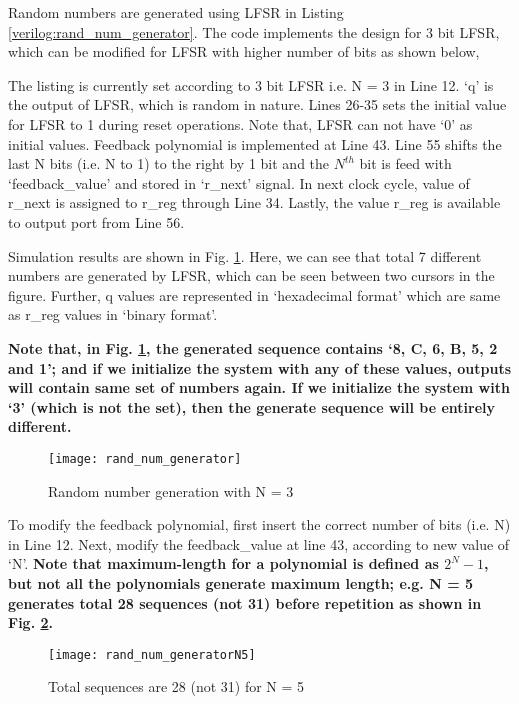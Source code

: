Random numbers are generated using LFSR in Listing \ref{verilog:rand_num_generator}. The code implements the design for 3 bit LFSR, which can be modified for LFSR with higher number of bits as shown below,  
\begin{explanation}
	The listing is currently set according to 3 bit LFSR i.e. N = 3 in Line 12.  `q' is the output of LFSR, which is random in nature. Lines 26-35 sets the initial value for LFSR to 1 during reset operations. Note that, LFSR can not have `0' as initial values. Feedback polynomial is implemented at Line 43. Line 55 shifts the last N bits (i.e. N to 1) to the right by 1 bit and the $N^{th}$ bit is feed with `feedback\_value' and stored in `r\_next' signal. In next clock cycle, value of r\_next is assigned to r\_reg through Line 34. Lastly, the value r\_reg is available to output port from Line 56.
	
	Simulation results are shown in Fig. \ref{fig:rand_num_generator}. Here, we can see that total 7 different numbers are generated by LFSR, which can be seen between two cursors in the figure.  Further, q values are represented in `hexadecimal format' which are same as r\_reg values in `binary format'. 
	
	\textbf{Note that, in Fig. \ref{fig:rand_num_generator}, the generated sequence contains `8, C, 6, B, 5, 2 and 1'; and if we initialize the system with any of these values, outputs will contain same set of numbers again. If we initialize the system with `3' (which is not the set), then the generate sequence will be entirely different.}
	
	\begin{figure}[!h]
		\centering
		\texttt{[image: rand\_num\_generator]}
		\caption{Random number generation with N = 3}
		\label{fig:rand_num_generator}
	\end{figure}
	
	To modify the feedback polynomial, first insert the correct number of bits (i.e. N) in  Line 12. Next, modify the feedback\_value at line 43, according to new value of `N'.\textbf{ Note that maximum-length for a polynomial is defined as $2^N-1$, but not all the polynomials generate maximum length; e.g. N = 5 generates total 28 sequences (not 31) before repetition as shown in Fig. \ref{fig:rand_num_generatorN5}. }
	
	\begin{figure}[!h]
		\centering
		\texttt{[image: rand\_num\_generatorN5]}
		\caption{Total sequences are 28 (not 31) for N = 5}
		\label{fig:rand_num_generatorN5}
	\end{figure}
\end{explanation}


